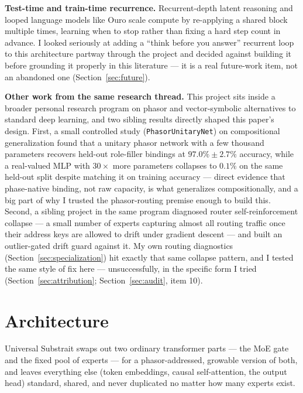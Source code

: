 \documentclass[11pt,letterpaper]{article}
\begin{document}
\textbf{Test-time and train-time recurrence.} Recurrent-depth latent reasoning \cite{geiping} and looped language models like Ouro \cite{ouro} scale compute by re-applying a shared block multiple times, learning when to stop rather than fixing a hard step count in advance. I looked seriously at adding a ``think before you answer'' recurrent loop to this architecture partway through the project and decided against building it before grounding it properly in this literature --- it is a real future-work item, not an abandoned one (Section~\ref{sec:future}).

\textbf{Other work from the same research thread.} This project sits inside a broader personal research program on phasor and vector-symbolic alternatives to standard deep learning, and two sibling results directly shaped this paper's design. First, a small controlled study (\texttt{PhasorUnitaryNet}) on compositional generalization found that a unitary phasor network with a few thousand parameters recovers held-out role-filler bindings at $97.0\% \pm 2.7\%$ accuracy, while a real-valued MLP with $30\times$ more parameters collapses to $0.1\%$ on the same held-out split despite matching it on training accuracy --- direct evidence that phase-native binding, not raw capacity, is what generalizes compositionally, and a big part of why I trusted the phasor-routing premise enough to build this. Second, a sibling project in the same program diagnosed router self-reinforcement collapse --- a small number of experts capturing almost all routing traffic once their address keys are allowed to drift under gradient descent --- and built an outlier-gated drift guard against it. My own routing diagnostics (Section~\ref{sec:specialization}) hit exactly that same collapse pattern, and I tested the same style of fix here --- unsuccessfully, in the specific form I tried (Section~\ref{sec:attribution}; Section~\ref{sec:audit}, item 10).

\section{Architecture}
\label{sec:architecture}

Universal Substrait swaps out two ordinary transformer parts --- the MoE gate and the fixed pool of experts --- for a phasor-addressed, growable version of both, and leaves everything else (token embeddings, causal self-attention, the output head) standard, shared, and never duplicated no matter how many experts exist.
\end{document}
